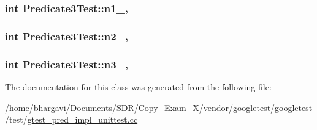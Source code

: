 \subsubsection[{\texorpdfstring{n1\+\_\+}{n1_}}]{\setlength{\rightskip}{0pt plus 5cm}int Predicate3\+Test\+::n1\+\_\+\hspace{0.3cm}{\ttfamily [static]}, {\ttfamily [protected]}}\hypertarget{class_predicate3_test_ac232320a93f0c1e09886148a3e1929a5}{}\label{class_predicate3_test_ac232320a93f0c1e09886148a3e1929a5}
\subsubsection[{\texorpdfstring{n2\+\_\+}{n2_}}]{\setlength{\rightskip}{0pt plus 5cm}int Predicate3\+Test\+::n2\+\_\+\hspace{0.3cm}{\ttfamily [static]}, {\ttfamily [protected]}}\hypertarget{class_predicate3_test_a11049ef16bcaadc8262faf7349c7676e}{}\label{class_predicate3_test_a11049ef16bcaadc8262faf7349c7676e}
\subsubsection[{\texorpdfstring{n3\+\_\+}{n3_}}]{\setlength{\rightskip}{0pt plus 5cm}int Predicate3\+Test\+::n3\+\_\+\hspace{0.3cm}{\ttfamily [static]}, {\ttfamily [protected]}}\hypertarget{class_predicate3_test_afc1df6b079ffe22b87479b161d2ad2f7}{}\label{class_predicate3_test_afc1df6b079ffe22b87479b161d2ad2f7}


The documentation for this class was generated from the following file\+:\begin{DoxyCompactItemize}
\item 
/home/bhargavi/\+Documents/\+S\+D\+R/\+Copy\+\_\+\+Exam\+\_\+X/vendor/googletest/googletest/test/\hyperlink{gtest__pred__impl__unittest_8cc}{gtest\+\_\+pred\+\_\+impl\+\_\+unittest.\+cc}\end{DoxyCompactItemize}
